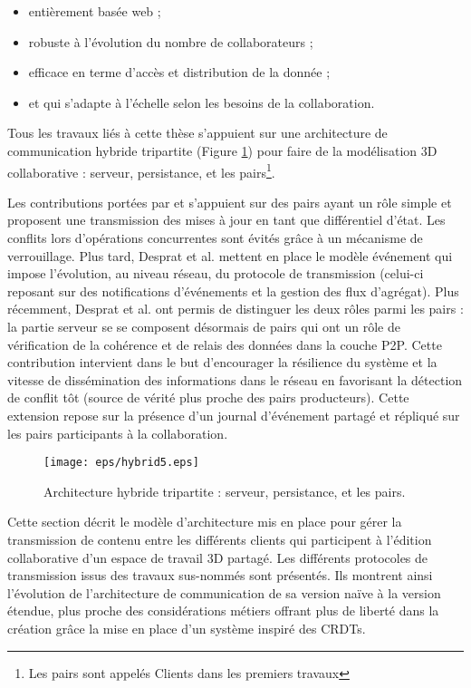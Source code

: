 \begin{itemize}
	\item entièrement basée web ; 
	\item robuste à l'évolution du nombre de collaborateurs ; 
	\item efficace en terme d'accès et distribution de la donnée ; 
	\item et qui s'adapte à l'échelle selon les besoins de la collaboration.
\end{itemize}


Tous les travaux liés à cette thèse 
\cite{Desprat2015a,Desprat2015b,Desprat2016,Desprat2017} s'appuient sur une 
architecture de communication hybride tripartite (Figure \ref{fig:hybrid}) pour 
faire de la modélisation 3D collaborative : serveur, persistance, 
et les pairs\footnote{Les pairs sont appelés \og Clients\fg{} dans les premiers 
travaux}. 

Les contributions portées par \cite{Desprat2015a} et \cite{Desprat2015b} 
s'appuient sur des pairs ayant un rôle simple et proposent une transmission des 
mises à jour en tant que différentiel d'état. Les conflits lors d'opérations 
concurrentes sont évités grâce à un mécanisme de verrouillage. 
Plus tard, Desprat et al.  \cite{Desprat2016} mettent en place le modèle événement qui impose 
l'évolution, au niveau réseau, du protocole de transmission (celui-ci reposant sur 
des notifications d'événements et la gestion des flux d'agrégat). 
Plus récemment, Desprat et al. \cite{Desprat2017} ont permis de distinguer les deux rôles parmi les pairs : la 
partie serveur se se composent désormais de pairs qui ont un rôle de vérification 
de la cohérence et de relais des données dans la couche \gls{P2P}. Cette 
contribution intervient dans le but d'encourager la résilience du système et la 
vitesse de dissémination des informations dans le réseau en favorisant la 
détection de conflit tôt (source de vérité plus proche des pairs producteurs). 
Cette extension repose sur la présence d'un journal d'événement partagé et 
répliqué sur les pairs participants à la collaboration.

\begin{figure}[h!]
	\centering
	\texttt{[image: eps/hybrid5.eps]}
	\caption{Architecture hybride tripartite : serveur, persistance, 
		et les pairs.}
	\label{fig:hybrid}
\end{figure}

Cette section décrit le modèle d'architecture mis en 
place pour gérer la transmission de contenu entre les différents clients 
qui participent à l'édition collaborative d'un espace de travail 3D partagé. 
Les différents protocoles de transmission issus des travaux sus-nommés 
sont présentés. Ils montrent ainsi l'évolution de l'architecture de communication de 
sa version naïve à la version étendue, plus proche des considérations métiers 
offrant plus de liberté dans la création grâce la mise en place d'un système inspiré 
des \glspl{CRDT}.
 
